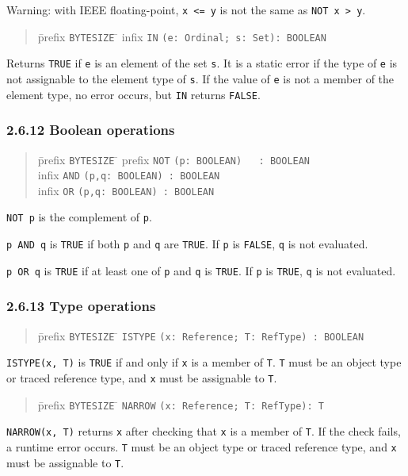 \documentclass[10pt]{article}
\begin{document}
Warning: with IEEE floating-point, \verb|x <= y| is not the same as
\verb|NOT x > y|.

\begin{quote}
  \begin{tabbing}
    \=prefix \= \verb|BYTESIZE| \= \kill
    \>infix  \> \verb|IN| \> \verb|(e: Ordinal; s: Set): BOOLEAN|
  \end{tabbing}
\end{quote}
Returns \verb|TRUE| if \verb|e| is an element of the set \verb|s|.  It is a
static error if the type of \verb|e| is not assignable to the element type of
\verb|s|.  If the value of \verb|e| is not a member of the element type, no
error occurs, but \verb|IN| returns \verb|FALSE|.

\subsubsection*{2.6.12 Boolean operations}

\begin{quote}
  \begin{tabbing}
    \=prefix \= \verb|BYTESIZE| \= \kill
    \>prefix \> \verb|NOT| \> \verb|(p: BOOLEAN)   : BOOLEAN| \\
    \>infix  \> \verb|AND| \> \verb|(p,q: BOOLEAN) : BOOLEAN| \\
    \>infix  \> \verb|OR|  \> \verb|(p,q: BOOLEAN) : BOOLEAN|
  \end{tabbing}
\end{quote}
\verb|NOT p| is the complement of \verb|p|.

\verb|p AND q| is \verb|TRUE| if both \verb|p| and \verb|q| are \verb|TRUE|.
If \verb|p| is \verb|FALSE|, \verb|q| is not evaluated.

\verb|p OR q| is \verb|TRUE| if at least one of \verb|p| and \verb|q| is
\verb|TRUE|.  If \verb|p| is \verb|TRUE|, \verb|q| is not evaluated.

\subsubsection*{2.6.13 Type operations}

\begin{quote}
  \begin{tabbing}
    \=prefix \= \verb|BYTESIZE| \= \kill
    \>       \> \verb|ISTYPE| \> \verb|(x: Reference; T: RefType) : BOOLEAN|
  \end{tabbing}
\end{quote}
\verb|ISTYPE(x, T)| is \verb|TRUE| if and only if \verb|x| is a member of
\verb|T|.  \verb|T| must be an object type or traced reference type, and
\verb|x| must be assignable to \verb|T|.
\begin{quote}
  \begin{tabbing}
    \=prefix \= \verb|BYTESIZE| \= \kill
    \>       \> \verb|NARROW| \> \verb|(x: Reference; T: RefType): T|
  \end{tabbing}
\end{quote}
\verb|NARROW(x, T)| returns \verb|x| after checking that \verb|x| is a member
of \verb|T|.  If the check fails, a runtime error occurs.  \verb|T| must be an
object type or traced reference type, and \verb|x| must be assignable to
\verb|T|.
\end{document}
